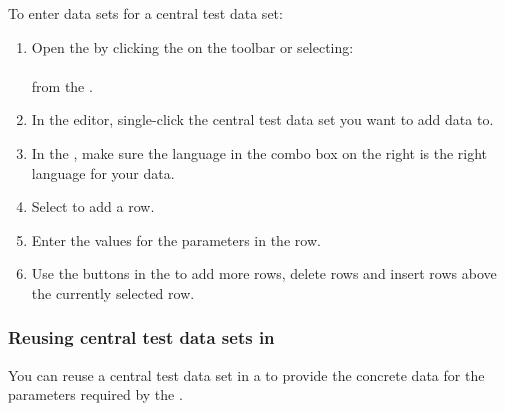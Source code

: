 To enter data sets for a central test data set:
\begin{enumerate}
\item Open the  \gddataeditor{} by clicking the  on the toolbar or selecting:\\
\\
from the \gdtestsuitebrowser{}.
\item In the editor, single-click the central test data set you want to add data to.
\item In the \gddatasetsview{}, make sure the language in the combo box on the right is the right language for your data. 
\item Select  to add a row. 
\item Enter the values for the parameters in the row. 
\item Use the buttons in the \gddatasetsview{} to  add more rows, delete rows and insert rows above the currently selected row. 
\end{enumerate}

\subsubsection{Reusing central test data sets in \gdcases{}}
\label{TasksCentralDataReference}

You can reuse a central test data set in a \gdcase{} to provide the concrete data for the parameters required by the \gdcase{}. 

